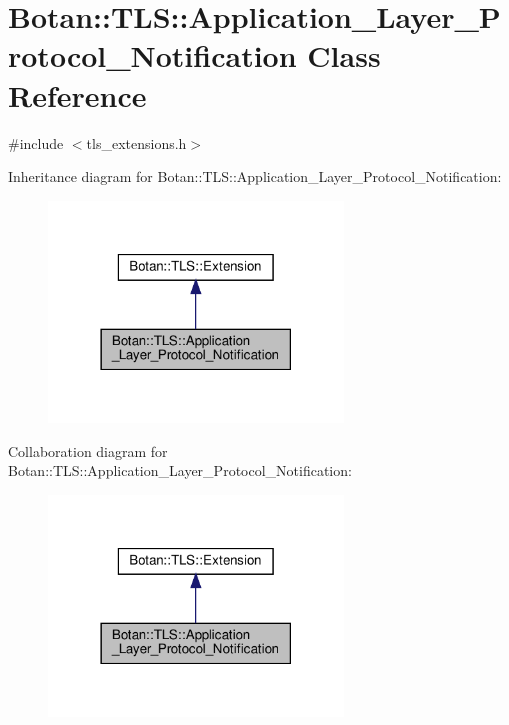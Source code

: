 \hypertarget{class_botan_1_1_t_l_s_1_1_application___layer___protocol___notification}{}\section{Botan\+:\+:T\+LS\+:\+:Application\+\_\+\+Layer\+\_\+\+Protocol\+\_\+\+Notification Class Reference}
\label{class_botan_1_1_t_l_s_1_1_application___layer___protocol___notification}


{\ttfamily \#include $<$tls\+\_\+extensions.\+h$>$}



Inheritance diagram for Botan\+:\+:T\+LS\+:\+:Application\+\_\+\+Layer\+\_\+\+Protocol\+\_\+\+Notification\+:
\nopagebreak
\begin{figure}[H]
\begin{center}
\leavevmode
\includegraphics[width=222pt]{class_botan_1_1_t_l_s_1_1_application___layer___protocol___notification__inherit__graph}
\end{center}
\end{figure}


Collaboration diagram for Botan\+:\+:T\+LS\+:\+:Application\+\_\+\+Layer\+\_\+\+Protocol\+\_\+\+Notification\+:
\nopagebreak
\begin{figure}[H]
\begin{center}
\leavevmode
\includegraphics[width=222pt]{class_botan_1_1_t_l_s_1_1_application___layer___protocol___notification__coll__graph}
\end{center}
\end{figure}
